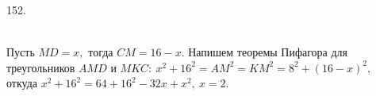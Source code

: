 152. \begin{figure}[ht!]
\end{figure}\\
Пусть $MD=x,$ тогда $CM=16-x.$ Напишем теоремы Пифагора для треугольников $AMD$ и $MKC:\ x^2+16^2=AM^2=KM^2=8^2+(16-x)^2,$ откуда $x^2+16^2=64+16^2-32x+x^2,\ x=2.$\newpage\noindent
